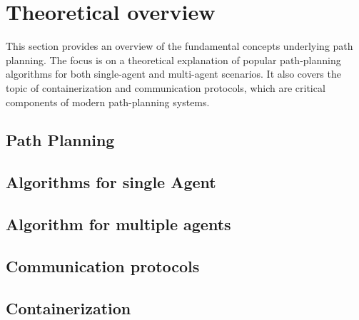 \chapter{Theoretical overview}
This section provides an overview of the fundamental concepts underlying path planning. The focus is on a theoretical explanation of popular path-planning algorithms for both single-agent and multi-agent scenarios. It also covers the topic of containerization and communication protocols, which are critical components of modern path-planning systems.
\section{Path Planning}


\section{Algorithms for single Agent}


\section{Algorithm for multiple agents}


\section{Communication protocols}


\section{Containerization}
